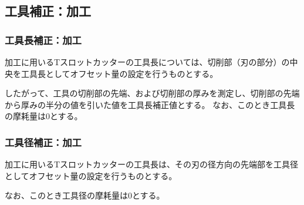 \clearpage


\subsection{工具補正：\Dimple 加工}

\subsubsection{工具長補正：\Dimple 加工}
\Dimple 加工に用いるTスロットカッターの工具長については、切削部（刃の部分）の中央を工具長としてオフセット量の設定を行うものとする。

したがって、工具の切削部の先端、および切削部の厚みを測定し、切削部の先端から厚みの半分の値を引いた値を工具長補正値とする。
なお、このとき工具長の摩耗量は0とする。

\subsubsection{工具径補正：\Dimple 加工}
\Dimple 加工に用いるTスロットカッターの工具長は、その刃の径方向の先端部を工具径としてオフセット量の設定を行うものとする。

なお、このとき工具径の摩耗量は0とする。


